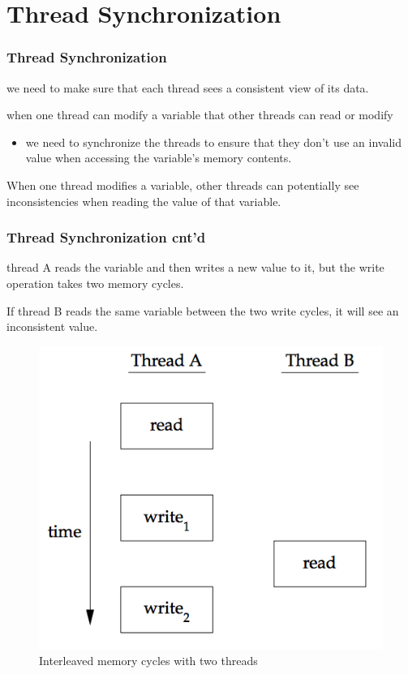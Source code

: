 \documentclass[newPxFont,sthlmFooter,nooffset]{beamer}
\begin{document}
\section{Thread Synchronization}
\begin{frame}[t]
  \frametitle{Thread Synchronization}
we need to make sure that each thread sees a consistent view of its data.

when one thread can modify a variable that other threads can read or
modify
\begin{itemize}
\item we need to synchronize the threads to ensure that
  they don’t use an invalid value when accessing the variable’s memory
  contents.
\end{itemize}
When one thread modifies a variable, other threads can
  potentially see inconsistencies when reading the value of that  variable.

\end{frame}

\begin{frame}[t]
  \frametitle{Thread Synchronization cnt'd}
thread A reads the variable and then writes a new value to
  it, but the write operation takes two memory cycles.

If thread B reads the same variable between the two write cycles, it will see an inconsistent value.

  \begin{figure}[h]
    \centering
    \includegraphics[width=0.4\linewidth]{figure/fig11-7}
    \caption{Interleaved memory cycles with two threads}
    \label{fig:work}
  \end{figure}


\end{frame}
\end{document}

